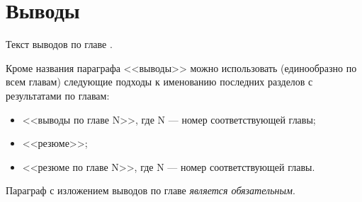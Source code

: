 \section{Выводы} \label{ch1:conclusion}
Текст выводов по главе \thechapter.

Кроме названия параграфа <<выводы>> можно использовать (единообразно по всем главам) следующие подходы к именованию последних разделов с результатами по главам:
\begin{itemize}
	\item <<выводы по главе N>>, где N --- номер соответствующей главы;
	\item <<резюме>>;
	\item <<резюме по главе N>>, где N --- номер соответствующей главы.
\end{itemize}

Параграф с изложением выводов по главе \textit{является обязательным}.

%
